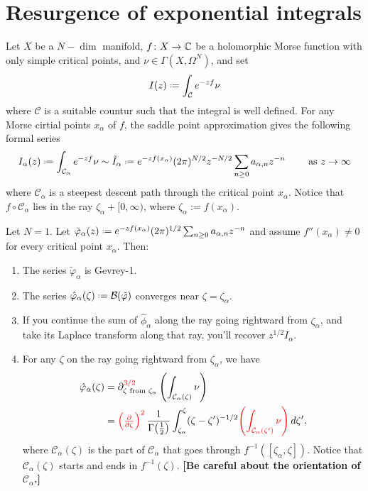 \documentclass[11pt,a4paper,twoside,leqno,noamsfonts]{amsart}
\numberwithin{equation}{section}
\begin{document}
\section{Resurgence of exponential integrals}
Let $X$ be a $N-\dim$ manifold, $f\colon X\to\mathbb C$ be a holomorphic Morse function with only simple critical points, and $\nu\in\Gamma(X,\Omega^N)$, and set
\begin{equation}
I(z)\defeq\int_{\mathcal{C}}e^{-zf}\nu
\end{equation}
where $\mathcal{C}$ is a suitable countur such that the integral is well defined.  
For any Morse cirtial points $x_\alpha$ of $f$, the saddle point approximation gives the following formal series 
\begin{equation}
I_{\alpha}(z)\defeq\int_{\mathcal{C}_\alpha}e^{-zf}\nu\sim \tilde{I}_{\alpha}\defeq e^{-zf(x_\alpha)}(2\pi)^{N/2} z^{-N/2}\sum_{n\geq 0}a_{\alpha,n}z^{-n} \qquad \text{ as } z\to\infty
\end{equation}
where $\mathcal{C}_\alpha$ is a steepest descent path through the critical point $x_\alpha$. Notice that $f \circ \mathcal{C}_\alpha$ lies in the ray $\zeta_\alpha + [0, \infty)$, where $\zeta_\alpha := f(x_\alpha)$.
\begin{theorem}\label{thm:maxim} Let $N=1$. Let $\tilde{\varphi}_{\alpha}(z)\defeq e^{-zf(x_\alpha)}(2\pi)^{1/2} \sum_{n\geq 0}a_{\alpha,n}z^{-n}$ and assume $f''(x_\alpha)\neq 0$ for every critical point $x_\alpha$. Then:
\begin{enumerate}
\item\label{int:series-gevrey} The series $\tilde{\varphi}_\alpha$ is Gevrey-1.
\item\label{int:resum-converges} The series $\hat{\varphi}_\alpha(\zeta)\defeq\mathcal{B}(\tilde{\varphi})$ converges near $\zeta=\zeta_{\alpha}$.
\item\label{int:resum-valid} If you continue the sum of $\hat{\phi}_\alpha$ along the ray going rightward from $\zeta_\alpha$, and take its Laplace transform along that ray, you'll recover $z^{1/2} I_\alpha$.
\item\label{int:deriv-formula} For any $\zeta$ on the ray going rightward from $\zeta_\alpha$, we have
\begin{align*}\label{formula1}
\hat{\varphi}_{\alpha}(\zeta) & = \partial^{\textcolor{red}{3/2}}_{\zeta \text{ from }\zeta_\alpha} \left( \int_{\mathcal{C}_\alpha(\zeta)} \nu \right) \\
& = \textcolor{red}{\left(\tfrac{\partial}{\partial \zeta}\right)^2}\,\frac{1}{\Gamma\big(\tfrac{1}{2}\big)} \int_{\zeta_\alpha}^\zeta (\zeta-\zeta')^{-1/2} \textcolor{red}{\left( \int_{\mathcal{C}_\alpha(\zeta')} \nu \right)}\,d\zeta',
\end{align*}
where $\mathcal{C}_\alpha(\zeta)$ is the part of $\mathcal{C}_\alpha$ that goes through $f^{-1}([\zeta_\alpha, \zeta])$. Notice that $\mathcal{C}_\alpha(\zeta)$ starts and ends in $f^{-1}(\zeta)$. \textbf{[Be careful about the orientation of $\mathcal{C}_\alpha$.]}
\end{enumerate}
\end{theorem}
\end{document}
